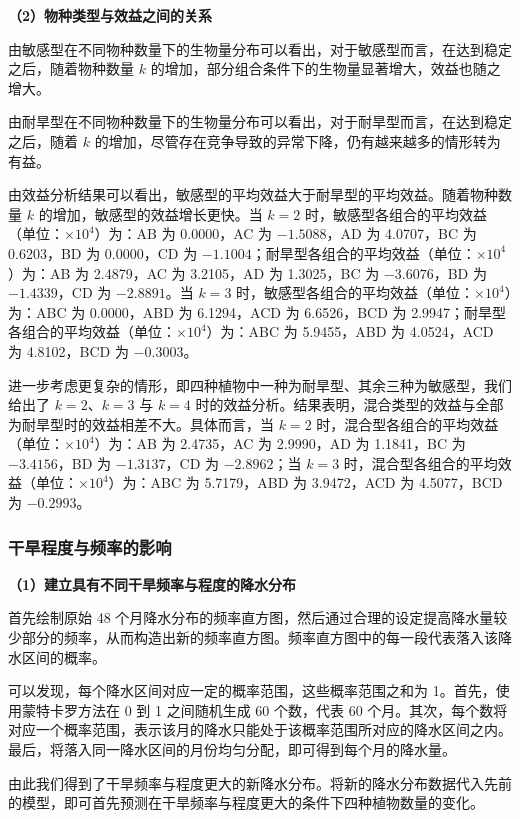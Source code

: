 \documentclass[11pt,a4paper]{ctexart}
\begin{document}
\textbf{（2）物种类型与效益之间的关系}

由敏感型在不同物种数量下的生物量分布可以看出，对于敏感型而言，在达到稳定之后，随着物种数量 $k$ 的增加，部分组合条件下的生物量显著增大，效益也随之增大。

由耐旱型在不同物种数量下的生物量分布可以看出，对于耐旱型而言，在达到稳定之后，随着 $k$ 的增加，尽管存在竞争导致的异常下降，仍有越来越多的情形转为有益。

由效益分析结果可以看出，敏感型的平均效益大于耐旱型的平均效益。随着物种数量 $k$ 的增加，敏感型的效益增长更快。当 $k=2$ 时，敏感型各组合的平均效益（单位：$\times10^{4}$）为：AB 为 0.0000，AC 为 $-1.5088$，AD 为 4.0707，BC 为 0.6203，BD 为 0.0000，CD 为 $-1.1004$；耐旱型各组合的平均效益（单位：$\times10^{4}$）为：AB 为 2.4879，AC 为 3.2105，AD 为 1.3025，BC 为 $-3.6076$，BD 为 $-1.4339$，CD 为 $-2.8891$。当 $k=3$ 时，敏感型各组合的平均效益（单位：$\times10^{4}$）为：ABC 为 0.0000，ABD 为 6.1294，ACD 为 6.6526，BCD 为 2.9947；耐旱型各组合的平均效益（单位：$\times10^{4}$）为：ABC 为 5.9455，ABD 为 4.0524，ACD 为 4.8102，BCD 为 $-0.3003$。

进一步考虑更复杂的情形，即四种植物中一种为耐旱型、其余三种为敏感型，我们给出了 $k=2$、$k=3$ 与 $k=4$ 时的效益分析。结果表明，混合类型的效益与全部为耐旱型时的效益相差不大。具体而言，当 $k=2$ 时，混合型各组合的平均效益（单位：$\times10^{4}$）为：AB 为 2.4735，AC 为 2.9990，AD 为 1.1841，BC 为 $-3.4156$，BD 为 $-1.3137$，CD 为 $-2.8962$；当 $k=3$ 时，混合型各组合的平均效益（单位：$\times10^{4}$）为：ABC 为 5.7179，ABD 为 3.9472，ACD 为 4.5077，BCD 为 $-0.2993$。

\subsubsection{干旱程度与频率的影响}

\textbf{（1）建立具有不同干旱频率与程度的降水分布}

首先绘制原始 48 个月降水分布的频率直方图，然后通过合理的设定提高降水量较少部分的频率，从而构造出新的频率直方图。频率直方图中的每一段代表落入该降水区间的概率。

可以发现，每个降水区间对应一定的概率范围，这些概率范围之和为 1。首先，使用蒙特卡罗方法在 0 到 1 之间随机生成 60 个数，代表 60 个月。其次，每个数将对应一个概率范围，表示该月的降水只能处于该概率范围所对应的降水区间之内。最后，将落入同一降水区间的月份均匀分配，即可得到每个月的降水量。

由此我们得到了干旱频率与程度更大的新降水分布。将新的降水分布数据代入先前的模型，即可首先预测在干旱频率与程度更大的条件下四种植物数量的变化。
\end{document}
